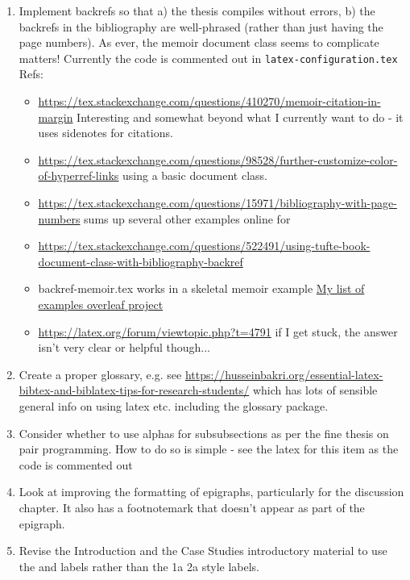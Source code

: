 \begin{enumerate}
    \item Implement backrefs so that a) the thesis compiles without errors, b) the backrefs in the bibliography are well-phrased (rather than just having the page numbers). As ever, the memoir document class seems to complicate matters! Currently the code is commented out in \texttt{latex-configuration.tex} Refs:
    \begin{itemize}
        \item \url{https://tex.stackexchange.com/questions/410270/memoir-citation-in-margin} Interesting and somewhat beyond what I currently want to do - it uses sidenotes for citations.
        \item \url{https://tex.stackexchange.com/questions/98528/further-customize-color-of-hyperref-links} using a basic document class.
        \item \url{https://tex.stackexchange.com/questions/15971/bibliography-with-page-numbers} sums up several other examples online for
        \item \url{https://tex.stackexchange.com/questions/522491/using-tufte-book-document-class-with-bibliography-backref}
        \item backref-memoir.tex works in a skeletal memoir example \href{https://www.overleaf.com/project/612fb5e6f6cc44c10b56afa1}{My list of examples overleaf project}
        \item \url{https://latex.org/forum/viewtopic.php?t=4791} if I get stuck, the answer isn't very clear or helpful though...
    \end{itemize}

    \item Create a proper glossary, e.g. see \url{https://husseinbakri.org/essential-latex-bibtex-and-biblatex-tips-for-research-students/} which has lots of sensible general info on using latex etc. including the glossary package.

    \item Consider whether to use alphas for subsubsections as per the fine thesis on pair programming. How to do so is simple - see the latex for this item as the code is commented out %

    \item Look at improving the formatting of epigraphs, particularly for the discussion chapter. It also has a footnotemark that doesn't appear as part of the epigraph.

    \item Revise the Introduction and the Case Studies introductory material to use the \uuse and \iuse labels rather than the 1a 2a style labels.


\end{enumerate}
